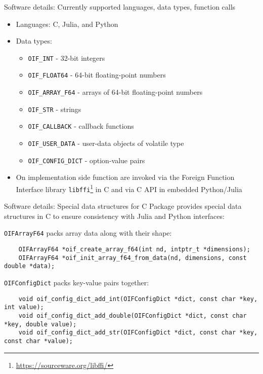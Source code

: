 \documentclass[
  10pt,
  aspectratio=169,
  english,
]{beamer}
\begin{document}
\begin{frame}{Software details: Currently supported languages, data types, function calls}
  \begin{itemize}
    \item Languages: C, Julia, and Python
    \item Data types:
          \begin{itemize}
            \item \texttt{OIF\_INT} - 32-bit integers
            \item \texttt{OIF\_FLOAT64} - 64-bit floating-point numbers
            \item \texttt{OIF\_ARRAY\_F64} - arrays of 64-bit floating-point numbers
            \item \texttt{OIF\_STR} - strings
            \item \texttt{OIF\_CALLBACK} - callback functions
            \item \texttt{OIF\_USER\_DATA} - user-data objects of volatile type
            \item \texttt{OIF\_CONFIG\_DICT} - option-value pairs
          \end{itemize}
    \item On implementation side function are invoked via
          the Foreign Function Interface library \texttt{libffi}\footnote{\url{https://sourceware.org/libffi/}}
          in C and via C API in embedded Python/Julia
  \end{itemize}
\end{frame}


\begin{frame}[fragile]{Software details: Special data structures for C}
  \small Package provides special data structures in C to ensure consistency
  with Julia and Python interfaces:

  \vspace{2em}
  \texttt{OIFArrayF64} packs array data along with their shape:
  \begin{verbatim}
    OIFArrayF64 *oif_create_array_f64(int nd, intptr_t *dimensions);
    OIFArrayF64 *oif_init_array_f64_from_data(nd, dimensions, const double *data);
  \end{verbatim}

  \vspace{2em}
  \texttt{OIFConfigDict} packs key-value pairs together:
  \begin{verbatim}
    void oif_config_dict_add_int(OIFConfigDict *dict, const char *key, int value);
    void oif_config_dict_add_double(OIFConfigDict *dict, const char *key, double value);
    void oif_config_dict_add_str(OIFConfigDict *dict, const char *key, const char *value);
  \end{verbatim}
\end{frame}
\end{document}
